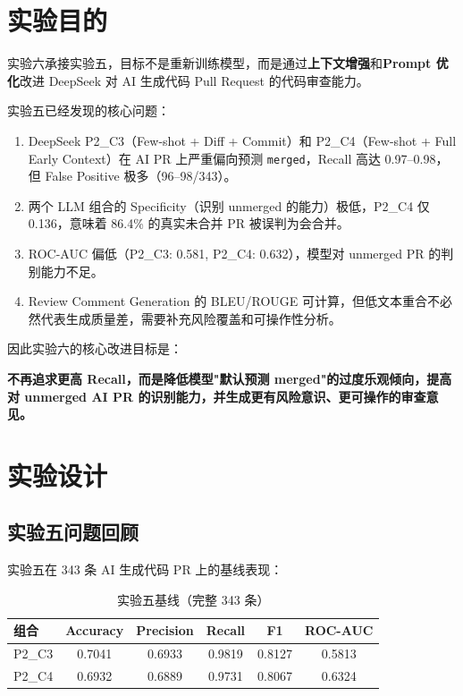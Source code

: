 \documentclass{experimentreport}
\begin{document}
\makereporthead

\section{实验目的}

实验六承接实验五，目标不是重新训练模型，而是通过\textbf{上下文增强}和\textbf{Prompt 优化}改进 DeepSeek 对 AI 生成代码 Pull Request 的代码审查能力。

实验五已经发现的核心问题：
\begin{enumerate}
    \item DeepSeek P2\_C3（Few-shot + Diff + Commit）和 P2\_C4（Few-shot + Full Early Context）在 AI PR 上严重偏向预测 \texttt{merged}，Recall 高达 0.97--0.98，但 False Positive 极多（96--98/343）。
    \item 两个 LLM 组合的 Specificity（识别 unmerged 的能力）极低，P2\_C4 仅 0.136，意味着 86.4\% 的真实未合并 PR 被误判为会合并。
    \item ROC-AUC 偏低（P2\_C3: 0.581, P2\_C4: 0.632），模型对 unmerged PR 的判别能力不足。
    \item Review Comment Generation 的 BLEU/ROUGE 可计算，但低文本重合不必然代表生成质量差，需要补充风险覆盖和可操作性分析。
\end{enumerate}

因此实验六的核心改进目标是：

\begin{center}
\large\textbf{不再追求更高 Recall，而是降低模型"默认预测 merged"的过度乐观倾向，提高对 unmerged AI PR 的识别能力，并生成更有风险意识、更可操作的审查意见。}
\end{center}


\section{实验设计}

\subsection{实验五问题回顾}

实验五在 343 条 AI 生成代码 PR 上的基线表现：

\begin{table}[htbp]
\centering
\caption{实验五基线（完整 343 条）}
\begin{tabular}{lccccc}
\toprule
组合 & Accuracy & Precision & Recall & F1 & ROC-AUC \\
\midrule
P2\_C3 & 0.7041 & 0.6933 & 0.9819 & 0.8127 & 0.5813 \\
P2\_C4 & 0.6932 & 0.6889 & 0.9731 & 0.8067 & 0.6324 \\
\bottomrule
\end{tabular}
\end{table}
\end{document}
